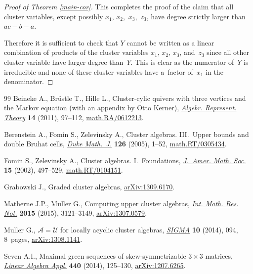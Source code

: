 \documentclass[11pt]{article}
\numberwithin{equation}{section}
\begin{document}
\begin{proof}[Proof of Theorem \ref{main-cor}]
This completes the proof of the claim that all cluster variables, except possibly $x_1$, $x_2$,~$x_3$,~$z_3$, have degree strictly larger than $ac-b-a$.

Therefore it is suf\/f\/icient to check that $Y$ cannot be written as a linear combination of products of the cluster variables $x_1$, $x_2$, $x_3$, and~$z_3$ since all other cluster variable have larger degree than~$Y$. This is clear as the numerator of~$Y$ is irreducible and none of these cluster variables have a~factor of~$x_1$ in the denominator.
\end{proof}
\begin{thebibliography}{99}
Beineke A., Br{\"u}stle T., Hille L., Cluster-cylic quivers with three vertices
  and the {M}arkov equation (with an appendix by Otto Kerner), \href{http://dx.doi.org/10.1007/s10468-009-9179-9}{\textit{Algebr.
  Represent. Theory}} \textbf{14} (2011), 97--112, \href{http://arxiv.org/abs/math.RA/0612213}{math.RA/0612213}.

Berenstein A., Fomin S., Zelevinsky A., Cluster algebras. {III}.~{U}pper bounds
  and double {B}ruhat cells, \href{http://dx.doi.org/10.1215/S0012-7094-04-12611-9}{\textit{Duke Math.~J.}} \textbf{126} (2005), 1--52,
  \href{http://arxiv.org/abs/math.RT/0305434}{math.RT/0305434}.

Fomin S., Zelevinsky A., Cluster algebras. {I}.~{F}oundations, \href{http://dx.doi.org/10.1090/S0894-0347-01-00385-X}{\textit{J.~Amer.
  Math. Soc.}} \textbf{15} (2002), 497--529, \href{http://arxiv.org/abs/math.RT/0104151}{math.RT/0104151}.

Grabowski J., Graded cluster algebras, \href{http://arxiv.org/abs/1309.6170}{arXiv:1309.6170}.

Matherne J.P., Muller G., Computing upper cluster algebras, \href{http://dx.doi.org/10.1093/imrn/rnu027}{\textit{Int. Math.
  Res. Not.}} \textbf{2015} (2015), 3121--3149, \href{http://arxiv.org/abs/1307.0579}{arXiv:1307.0579}.

Muller G., {${\mathcal A}={\mathcal U}$} for locally acyclic cluster algebras,
  \href{http://dx.doi.org/10.3842/SIGMA.2014.094}{\textit{SIGMA}} \textbf{10} (2014), 094, 8~pages, \href{http://arxiv.org/abs/1308.1141}{arXiv:1308.1141}.


Seven A.I., Maximal green sequences of skew-symmetrizable {$3\times3$}
  matrices, \href{http://dx.doi.org/10.1016/j.laa.2013.10.018}{\textit{Linear Algebra Appl.}} \textbf{440} (2014), 125--130,
  \href{http://arxiv.org/abs/1207.6265}{arXiv:1207.6265}.

\end{thebibliography}
\end{document}
